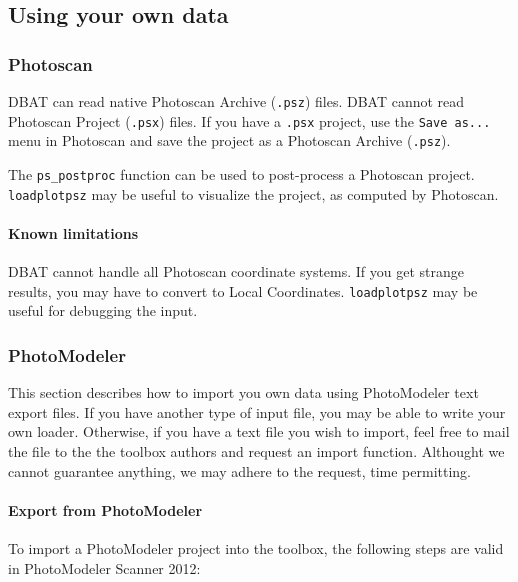 \documentclass{article}
\begin{document}
\subsection{Using your own data}

\subsubsection{Photoscan}

DBAT can read native Photoscan Archive (\verb+.psz+) files. DBAT
cannot read Photoscan Project (\verb+.psx+) files. If you have a
\verb+.psx+ project, use the \verb+Save as...+ menu in
Photoscan and save the project as a Photoscan Archive (\verb+.psz+).

The \verb+ps_postproc+ function can be used to post-process a
Photoscan project. \verb+loadplotpsz+ may be useful to visualize the
project, as computed by Photoscan.

\paragraph{Known limitations}

DBAT cannot handle all Photoscan coordinate systems. If you get
strange results, you may have to convert to Local Coordinates. \verb+loadplotpsz+ may be useful for debugging the input.

\subsubsection{PhotoModeler}

This section describes how to import you own data using PhotoModeler
text export files. If you have another type of input file, you may be
able to write your own loader. Otherwise, if you have a text file you
wish to import, feel free to mail the file to the the toolbox authors
and request an import function. Althought we cannot guarantee
anything, we may adhere to the request, time permitting.

\paragraph{Export from PhotoModeler}

To import a PhotoModeler project into the toolbox, the following
steps are valid in PhotoModeler Scanner 2012:
\end{document}
